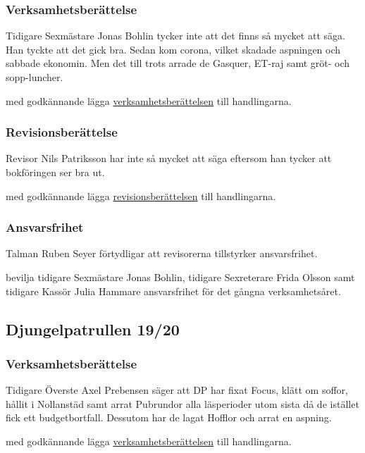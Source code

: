 \documentclass[hidelinks]{../sektionsmote} %
\begin{document}
\subsubsection{Verksamhetsberättelse}
Tidigare Sexmästare Jonas Bohlin tycker inte att det finns så mycket att säga.
Han tyckte att det gick bra.
Sedan kom corona, vilket skadade aspningen och sabbade ekonomin.
Men det till trots arrade de Gasquer, ET-raj samt gröt- och sopp-luncher.
\begin{beslut}
    \item med godkännande lägga \hyperlink{bilagor/f6/vb.pdf.1}{verksamhetsberättelsen} till handlingarna.
\end{beslut}

\subsubsection{Revisionsberättelse}
Revisor Nils Patriksson har inte så mycket att säga eftersom han tycker att bokföringen ser bra ut.
\begin{beslut}
    \item med godkännande lägga \hyperlink{bilagor/f6/rb.pdf.1}{revisionsberättelsen} till handlingarna.
\end{beslut}

\subsubsection{Ansvarsfrihet}
Talman Ruben Seyer förtydligar att revisorerna tillstyrker ansvarsfrihet.
\begin{beslut}
    \item bevilja tidigare Sexmästare Jonas Bohlin, tidigare Sexreterare Frida Olsson samt tidigare Kassör Julia Hammare ansvarsfrihet för det gångna verksamhetsåret.
\end{beslut}

\subsection{Djungelpatrullen 19/20}

\subsubsection{Verksamhetsberättelse}
Tidigare Överste Axel Prebensen säger att DP har fixat Focus, klätt om soffor, hållit i Nollanstäd samt arrat Pubrundor alla läsperioder utom sista då de istället fick ett budgetbortfall.
Dessutom har de lagat Hofflor och arrat en aspning.
\begin{beslut}
    \item med godkännande lägga \hyperlink{bilagor/dp/vb.pdf.1}{verksamhetsberättelsen} till handlingarna.
\end{beslut}
\end{document}
